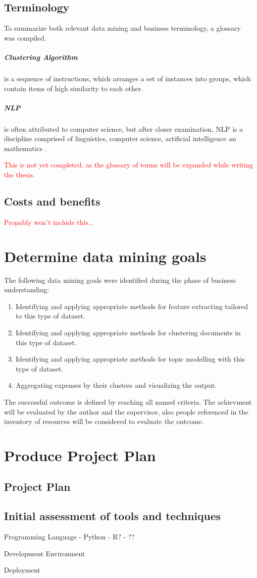 \subsection{Terminology}
To summarize both relevant data mining and business terminology, a glossary was compiled.

	\subparagraph{Clustering Algorithm} is a sequence of instructions, which arranges a set of instances into groups, which contain items of high similarity to each other.
	\subparagraph{\ac{NLP}}is often attributed to computer science, but after closer examination, \ac{NLP} is a discipline comprised of linguistics, computer science, artificial intelligence an mathematics \cite{chowdhury2003}.
	
	\textcolor{red}{This is not yet completed, as the glossary of terms will be expanded while writing the thesis.}

\subsection{Costs and benefits}
	\textcolor{red}{Propably won't include this...}

\section{Determine data mining goals}
The following data mining goals were identified during the phase of business understanding:

\begin{enumerate}
\item Identifying and applying appropriate methods for feature extracting tailored to this type of dataset.
\item Identifying and applying appropriate methods for clustering documents in this type of dataset.
\item Identifying and applying appropriate methods for topic modelling with this type of dataset.
\item Aggregating expenses by their clusters and visualizing the output.
\end{enumerate}

The successful outcome is defined by reaching all named criteria. The achievment will be evaluated by the author and the supervisor, also people referenced in the inventory of resources will be considered to evaluate the outcome.


\section{Produce Project Plan}

\subsection{Project Plan}

\subsection{Initial assessment of tools and techniques}
Programming Language
- Python
- R?
- ??

Development Environment

Deployment













